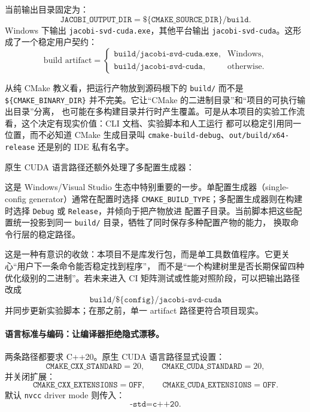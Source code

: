 当前输出目录固定为：
\[
    \texttt{JACOBI\_OUTPUT\_DIR}=\texttt{\$\{CMAKE\_SOURCE\_DIR\}/build}.
\]
Windows 下输出 \texttt{jacobi-svd-cuda.exe}，其他平台输出 \texttt{jacobi-svd-cuda}。这形成了一个稳定用户契约：
\[
    \text{build artifact}
    =
    \begin{cases}
        \texttt{build/jacobi-svd-cuda.exe}, & \text{Windows},   \\
        \texttt{build/jacobi-svd-cuda},     & \text{otherwise}.
    \end{cases}
\]

从纯 CMake 教义看，把运行产物放到源码根下的 \texttt{build/} 而不是
\texttt{\$\{CMAKE\_BINARY\_DIR\}} 并不完美。它让“CMake 的二进制目录”和“项目的可执行输出目录”分离，
也可能在多构建目录并行时产生覆盖。可是从本项目的实验工作流看，这个决定有现实价值：CLI 文档、实验脚本和人工运行
都可以稳定引用同一位置，而不必知道 CMake 生成目录叫 \texttt{cmake-build-debug}、\texttt{out/build/x64-release}
还是别的 IDE 私有名字。

原生 CUDA 语言路径还额外处理了多配置生成器：

这是 Windows/Visual Studio 生态中特别重要的一步。单配置生成器（single-config generator）通常在配置时选择
\texttt{CMAKE\_BUILD\_TYPE}；多配置生成器则在构建时选择 \texttt{Debug} 或 \texttt{Release}，并倾向于把产物放进
配置子目录。当前脚本把这些配置统一投影到同一 \texttt{build/} 目录，牺牲了同时保存多种配置产物的能力，
换取命令行层的稳定路径。

这是一种有意识的收敛：本项目不是库发行包，而是单工具数值程序。它更关心“用户下一条命令能否稳定找到程序”，
而不是“一个构建树里是否长期保留四种优化级别的二进制”。若未来进入 CI 矩阵测试或性能对照阶段，可以把输出路径改成
\[
    \texttt{build/\$\{config\}/jacobi-svd-cuda}
\]
并同步更新实验脚本；在那之前，单一 artifact 路径更符合项目现实。

\paragraph{语言标准与编码：让编译器拒绝隐式漂移。}

两条路径都要求 C++20。原生 CUDA 语言路径显式设置：
\[
    \texttt{CMAKE\_CXX\_STANDARD}=20,\qquad
    \texttt{CMAKE\_CUDA\_STANDARD}=20,
\]
并关闭扩展：
\[
    \texttt{CMAKE\_CXX\_EXTENSIONS}=\texttt{OFF},\qquad
    \texttt{CMAKE\_CUDA\_EXTENSIONS}=\texttt{OFF}.
\]
默认 \texttt{nvcc} driver mode 则传入：
\[
    \texttt{-std=c++20}.
\]

